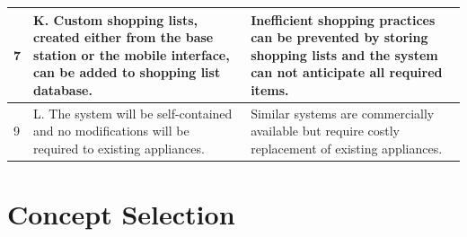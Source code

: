 \documentclass[11pt]{article} %
\begin{document}
\begin{table}[h!]
\begin{center}
\begin{tabular}{| p{1.2in} | p{2.5in} |p{2.5in} |}
\hline
7&K. Custom shopping lists, created either from the base station or the mobile interface, can be added to shopping list database.&Inefficient shopping practices can be prevented by storing shopping lists and the system can not anticipate all required items.\\
\hline
9&L. The system will be self-contained and no modifications will be required to existing appliances.&Similar systems are commercially available but require costly replacement of existing appliances.\\
\hline
\end{tabular}
\end{center}
\end{table}
\pagebreak
\section{Concept Selection}
\end{document}
